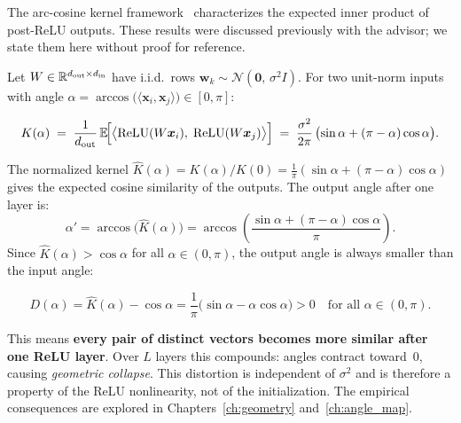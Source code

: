 The arc-cosine kernel framework~\cite{cho2009kernel} characterizes
the expected inner product of post-ReLU outputs.
These results were discussed previously with the advisor; we state
them here without proof for reference.

Let $W \in \mathbb{R}^{d_{\mathrm{out}} \times d_{\mathrm{in}}}$ have i.i.d.\
rows $\bm{w}_k \sim \mathcal{N}(\bm{0},\, \sigma^2 I)$.
For two unit-norm inputs with angle
$\alpha = \arccos\!\bigl(\langle \bm{x}_i, \bm{x}_j \rangle\bigr)
  \in [0,\pi]$:

\begin{theorem}
\label{thm:kernel}
\begin{equation}\label{eq:kernel}
  K(\alpha)
  \;=\;
  \frac{1}{d_{\mathrm{out}}}
  \,\mathbb{E}\!\Bigl[
    \bigl\langle \operatorname{ReLU}(W\bm{x}_i),\; \operatorname{ReLU}(W\bm{x}_j) \bigr\rangle
  \Bigr]
  \;=\;
  \frac{\sigma^2}{2\pi}\,
  \bigl(\sin\alpha + (\pi - \alpha)\cos\alpha\bigr).
\end{equation}
\end{theorem}

The normalized kernel $\hat{K}(\alpha) = K(\alpha)/K(0)
= \frac{1}{\pi}(\sin\alpha + (\pi-\alpha)\cos\alpha)$
gives the expected cosine similarity of the outputs.
The output angle after one layer is:
\begin{equation}\label{eq:angle_map}
  \alpha' = \arccos\!\bigl(\hat{K}(\alpha)\bigr)
  = \arccos\!\left(
    \frac{\sin\alpha + (\pi-\alpha)\cos\alpha}{\pi}
  \right).
\end{equation}
Since $\hat{K}(\alpha) > \cos\alpha$ for all $\alpha \in (0,\pi)$,
the output angle is always smaller than the input angle:

\begin{proposition}
\label{prop:distortion}
\begin{equation}\label{eq:distortion}
  D(\alpha)
  = \hat{K}(\alpha) - \cos\alpha
  = \frac{1}{\pi}\bigl(\sin\alpha - \alpha\cos\alpha\bigr)
  > 0
  \quad\text{for all } \alpha \in (0, \pi).
\end{equation}
\end{proposition}

\noindent
This means \textbf{every pair of distinct vectors becomes more similar
after one ReLU layer}.  Over $L$ layers this compounds: angles contract
toward~$0$, causing \emph{geometric collapse}.
This distortion is independent of $\sigma^2$ and is therefore
a property of the ReLU nonlinearity, not of the initialization.
The empirical consequences are explored in
Chapters~\ref{ch:geometry} and~\ref{ch:angle_map}.

